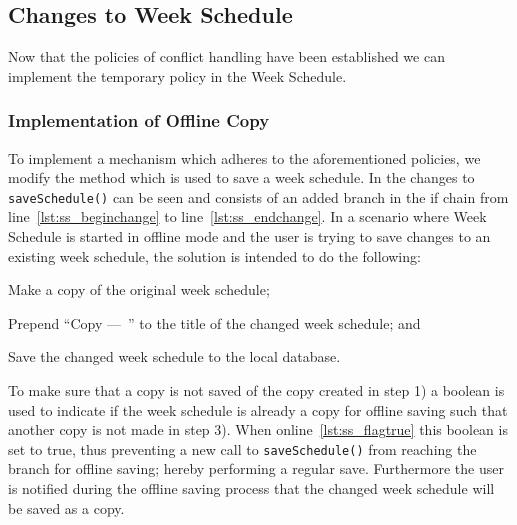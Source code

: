 \subsection{Changes to Week Schedule}
Now that the policies of conflict handling have been established we can implement the temporary policy in the Week Schedule.

\subsubsection{Implementation of Offline Copy}
To implement a mechanism which adheres to the aforementioned policies, we modify the method which is used to save a week schedule.
In  the changes to \texttt{saveSchedule()} can be seen and consists of an added branch in the if chain from line~\ref{lst:ss_beginchange} to line~\ref{lst:ss_endchange}.
In a scenario where Week Schedule is started in offline mode and the user is trying to save changes to an existing week schedule, the solution is intended to do the following:
\begin{enumberate}
\item Make a copy of the original week schedule;
\item Prepend \enquote{Copy ---~} to the title of the changed week schedule; and
\item Save the changed week schedule to the local database.
\end{enumberate}

To make sure that a copy is not saved of the copy created in step 1) a boolean is used to indicate if the week schedule is already a copy for offline saving such that another copy is not made in step 3).
When online~\ref{lst:ss_flagtrue} this boolean is set to true, thus preventing a new call to \texttt{saveSchedule()} from reaching the branch for offline saving; hereby performing a regular save.
Furthermore the user is notified during the offline saving process that the changed week schedule will be saved as a copy.

